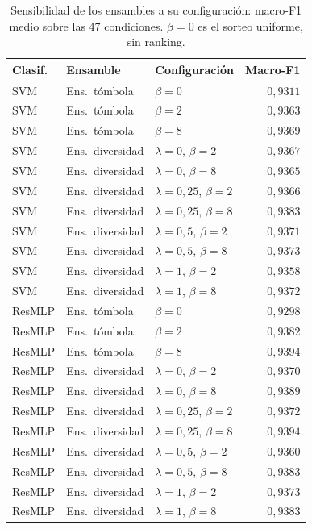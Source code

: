\begin{table}[H]
\centering\fontsize{8}{10}\selectfont\setlength{\tabcolsep}{3.0pt}
\caption{Sensibilidad de los ensambles a su configuración: macro-F1 medio sobre las 47 condiciones. $\beta=0$ es el sorteo uniforme, sin ranking.}
\label{tab:sel-config}
\begin{tabular}{@{}lllr@{}}
\toprule
Clasif. & Ensamble & Configuración & Macro-F1 \\
\midrule
SVM & Ens.\ tómbola & $\beta=0$ & $0{,}9311$ \\
SVM & Ens.\ tómbola & $\beta=2$ & $0{,}9363$ \\
SVM & Ens.\ tómbola & $\beta=8$ & $0{,}9369$ \\
SVM & Ens.\ diversidad & $\lambda=0$, $\beta=2$ & $0{,}9367$ \\
SVM & Ens.\ diversidad & $\lambda=0$, $\beta=8$ & $0{,}9365$ \\
SVM & Ens.\ diversidad & $\lambda=0{,}25$, $\beta=2$ & $0{,}9366$ \\
SVM & Ens.\ diversidad & $\lambda=0{,}25$, $\beta=8$ & $0{,}9383$ \\
SVM & Ens.\ diversidad & $\lambda=0{,}5$, $\beta=2$ & $0{,}9371$ \\
SVM & Ens.\ diversidad & $\lambda=0{,}5$, $\beta=8$ & $0{,}9373$ \\
SVM & Ens.\ diversidad & $\lambda=1$, $\beta=2$ & $0{,}9358$ \\
SVM & Ens.\ diversidad & $\lambda=1$, $\beta=8$ & $0{,}9372$ \\
ResMLP & Ens.\ tómbola & $\beta=0$ & $0{,}9298$ \\
ResMLP & Ens.\ tómbola & $\beta=2$ & $0{,}9382$ \\
ResMLP & Ens.\ tómbola & $\beta=8$ & $0{,}9394$ \\
ResMLP & Ens.\ diversidad & $\lambda=0$, $\beta=2$ & $0{,}9370$ \\
ResMLP & Ens.\ diversidad & $\lambda=0$, $\beta=8$ & $0{,}9389$ \\
ResMLP & Ens.\ diversidad & $\lambda=0{,}25$, $\beta=2$ & $0{,}9372$ \\
ResMLP & Ens.\ diversidad & $\lambda=0{,}25$, $\beta=8$ & $0{,}9394$ \\
ResMLP & Ens.\ diversidad & $\lambda=0{,}5$, $\beta=2$ & $0{,}9360$ \\
ResMLP & Ens.\ diversidad & $\lambda=0{,}5$, $\beta=8$ & $0{,}9383$ \\
ResMLP & Ens.\ diversidad & $\lambda=1$, $\beta=2$ & $0{,}9373$ \\
ResMLP & Ens.\ diversidad & $\lambda=1$, $\beta=8$ & $0{,}9383$ \\
\bottomrule
\end{tabular}
\end{table}
